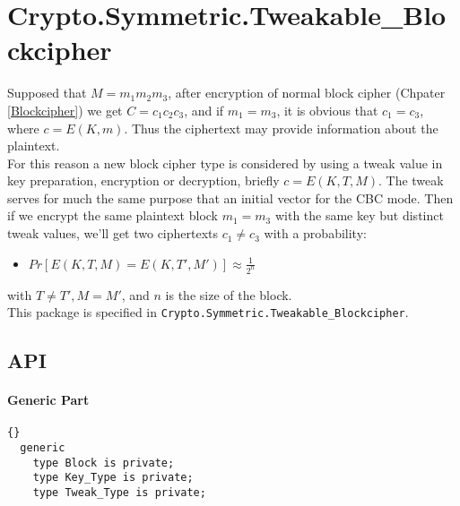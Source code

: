 \chapter{Crypto.Symmetric.Tweakable\_Blockcipher}
Supposed that $M=m_1m_2m_3$, after encryption of normal block cipher (Chpater \ref{Blockcipher}) we get $C=c_1c_2c_3$, and if $m_1=m_3$, it is obvious that $c_1=c_3$, where $c=E(K,m)$. Thus the ciphertext may provide information about the plaintext.\\
For this reason a new block cipher type is considered by using a tweak value in key preparation, encryption or decryption, briefly $c=E(K,T,M)$. The tweak serves for much the same purpose that an initial vector for the CBC mode. Then if we encrypt the same plaintext block $m_1=m_3$ with the same key but distinct tweak values, we'll get two ciphertexts $c_1\neq c_3$ with a probability:
\begin{itemize}
\item $Pr[E(K,T,M)=E(K,T',M')]\approx \frac{1}{2^n}$
\end{itemize}
with $T\neq T', M=M'$, and $n$ is the size of the block. \\
This package is specified in \texttt{Crypto.Symmetric.Tweakable\_Blockcipher}.
\section{API}
\subsubsection*{Generic Part}
\begin{lstlisting}{}
  generic
    type Block is private;
    type Key_Type is private;
    type Tweak_Type is private;
\end{lstlisting}
